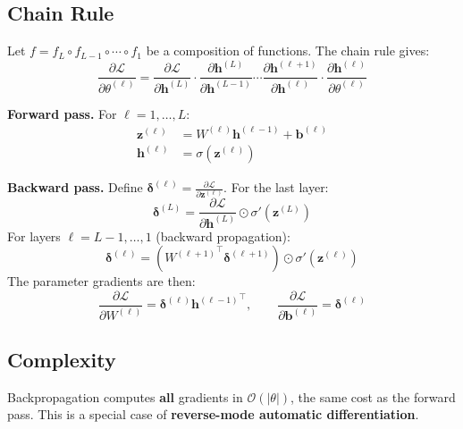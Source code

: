 \subsection{Chain Rule}

Let $f = f_L \circ f_{L-1} \circ \cdots \circ f_1$ be a composition of functions. The chain rule gives:
\[
\frac{\partial \mathcal{L}}{\partial \theta^{(\ell)}} = \frac{\partial \mathcal{L}}{\partial \bm{h}^{(L)}} \cdot \frac{\partial \bm{h}^{(L)}}{\partial \bm{h}^{(L-1)}} \cdots \frac{\partial \bm{h}^{(\ell+1)}}{\partial \bm{h}^{(\ell)}} \cdot \frac{\partial \bm{h}^{(\ell)}}{\partial \theta^{(\ell)}}
\]

\begin{mathbox}[title=\textbf{Backpropagation Derivation for an MLP}]
\textbf{Forward pass.} For $\ell = 1, \ldots, L$:
\begin{align*}
\bm{z}^{(\ell)} &= W^{(\ell)} \bm{h}^{(\ell-1)} + \bm{b}^{(\ell)} \\
\bm{h}^{(\ell)} &= \sigma(\bm{z}^{(\ell)})
\end{align*}

\textbf{Backward pass.} Define $\bm{\delta}^{(\ell)} = \frac{\partial \mathcal{L}}{\partial \bm{z}^{(\ell)}}$. For the last layer:
\[
\bm{\delta}^{(L)} = \frac{\partial \mathcal{L}}{\partial \bm{h}^{(L)}} \odot \sigma'(\bm{z}^{(L)})
\]
For layers $\ell = L-1, \ldots, 1$ (backward propagation):
\[
\bm{\delta}^{(\ell)} = \left({W^{(\ell+1)}}^\top \bm{\delta}^{(\ell+1)}\right) \odot \sigma'(\bm{z}^{(\ell)})
\]
The parameter gradients are then:
\[
\frac{\partial \mathcal{L}}{\partial W^{(\ell)}} = \bm{\delta}^{(\ell)} {\bm{h}^{(\ell-1)}}^\top, \qquad \frac{\partial \mathcal{L}}{\partial \bm{b}^{(\ell)}} = \bm{\delta}^{(\ell)}
\]
\end{mathbox}

\subsection{Complexity}

\begin{proposition}
Backpropagation computes \textbf{all} gradients in $\mathcal{O}(|\theta|)$, the same cost as the forward pass. This is a special case of \textbf{reverse-mode automatic differentiation}.
\end{proposition}

